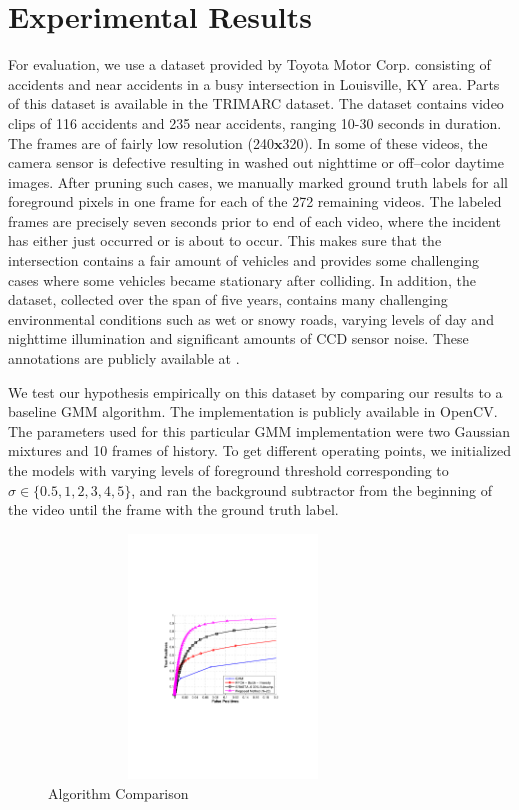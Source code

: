 \documentclass{article}
\begin{document}
\section{Experimental Results}
For evaluation, we use a dataset provided by Toyota Motor Corp. consisting of accidents and near accidents in a busy intersection in Louisville, KY area.  Parts of this dataset is available in the TRIMARC dataset\cite{toyota_dataset}.  The dataset contains video clips of 116 accidents and 235 near accidents,  ranging 10-30 seconds in duration.  The frames are of fairly low resolution (240$\mathbf{x}$320). In some of these videos, the camera sensor is defective resulting in washed out nighttime or off--color daytime images.  After pruning such cases, we manually marked ground truth labels for all foreground pixels in one frame for each of the 272 remaining videos.  The labeled frames are precisely seven seconds prior to end of each video, where the incident has either just occurred or is about to occur.  This makes sure that the intersection contains a fair amount of vehicles and provides some challenging cases where some vehicles became stationary after colliding.  In addition, the dataset, collected over the span of five years, contains many challenging environmental conditions such as wet or snowy roads, varying levels of day and nighttime illumination and significant amounts of CCD sensor noise. These annotations are  publicly available at \cite{datasetLink}. 


We test our hypothesis empirically on this dataset by comparing our results to a baseline GMM\cite{ZivGMM} algorithm.  The implementation is publicly available in OpenCV\cite{opencv_library}.  The parameters used for this particular GMM implementation were two Gaussian mixtures and 10 frames of history.  To get different operating points, we initialized the models with varying levels of foreground threshold corresponding to $\sigma \in \{0.5, 1, 2, 3, 4, 5\}$, and ran the background subtractor from the beginning of the video until the frame with the ground truth label.

\begin{figure}[htb]
\begin{minipage}[b]{\linewidth}
  \centering
  \centerline{\includegraphics[trim = 35mm 87mm 30mm 92mm, clip,  width=9.25cm, height = 6.5cm]{Imgs/ROC_comp_curve_zoom.pdf}}
\end{minipage}

\caption{Algorithm Comparison}
\label{fig:roc}
\end{figure}
\end{document}

